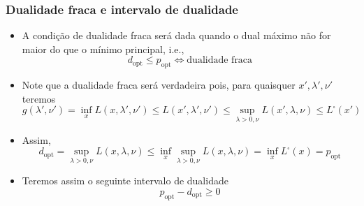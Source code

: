 \begin{frame}[allowframebreaks]
  \frametitle{Dualidade fraca e intervalo de dualidade}
  \begin{itemize}
  \item A condição de dualidade fraca será dada quando o dual máximo não for
	maior do que o mínimo principal, i.e.,
	\begin{equation}
	d_{\text{opt}} \leq p_{\text{opt}} \Leftrightarrow \text{dualidade fraca}
	\end{equation}
  \item Note que a dualidade fraca será verdadeira pois, para quaisquer $x', \lambda', \nu'$ teremos
	\begin{equation}
	g(\lambda', \nu') = \inf_x L(x,\lambda', \nu') \leq L(x', \lambda', \nu') \leq 
		\sup_{\lambda > 0, \nu} L(x',\lambda, \nu) \leq L^{\square} (x')
	\end{equation}
  \item Assim,
	\begin{equation}
	d_{\text{opt}} = \sup_{\lambda > 0, \nu} L(x,\lambda, \nu) \leq \inf_x \sup_{\lambda > 0, \nu} L(x,\lambda, \nu) = \inf_x L^{\square} (x) = p_{\text{opt}}
	\end{equation}
  \item Teremos assim o seguinte intervalo de dualidade
	\begin{equation}
	p_{\text{opt}} - d_{\text{opt}} \geq 0
	\end{equation}
  \end{itemize}
\end{frame}

